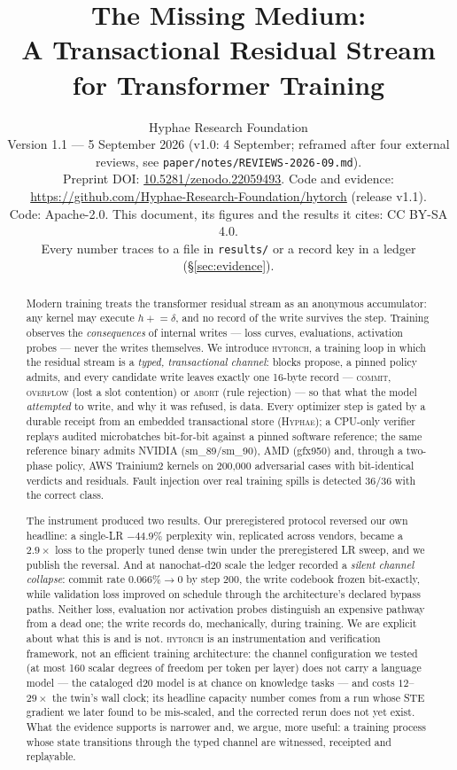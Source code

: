 \documentclass[10pt,twocolumn]{article}
\title{\textbf{The Missing Medium:\\ A Transactional Residual Stream for Transformer Training}}
\author{
  Hyphae Research Foundation\\[2pt]
  \small Version 1.1 --- 5 September 2026 (v1.0: 4 September; reframed after four external reviews, see \texttt{paper/notes/REVIEWS-2026-09.md}).\\
  \small Preprint DOI: \href{https://doi.org/10.5281/zenodo.22059493}{10.5281/zenodo.22059493}. Code and evidence: \url{https://github.com/Hyphae-Research-Foundation/hytorch} (release v1.1).\\
  \small Code: Apache-2.0. This document, its figures and the results it cites: CC BY-SA 4.0.\\
  \small Every number traces to a file in \texttt{results/} or a record key in a \hyphae{} ledger (\S\ref{sec:evidence}).
}
\date{}
\newcommand{\sys}{\textsc{hytorch}}
\newcommand{\hyphae}{\textsc{Hyphae}}
\begin{document}
\maketitle

\begin{abstract}
Modern training treats the transformer residual stream as an anonymous
accumulator: any kernel may execute $h \mathrel{+}= \delta$, and no record of
the write survives the step. Training observes the \emph{consequences} of
internal writes --- loss curves, evaluations, activation probes --- never the
writes themselves. We introduce \sys{}, a training loop in which the residual
stream is a \emph{typed, transactional channel}: blocks propose, a pinned
policy admits, and every candidate write leaves exactly one 16-byte record
--- \textsc{commit}, \textsc{overflow} (lost a slot contention) or
\textsc{abort} (rule rejection) --- so that what the model \emph{attempted}
to write, and why it was refused, is data. Every optimizer step is gated by a
durable receipt from an embedded transactional store (\hyphae{}); a CPU-only
verifier replays audited microbatches bit-for-bit against a pinned software
reference; the same reference binary admits NVIDIA (sm\_89/sm\_90), AMD
(gfx950) and, through a two-phase policy, AWS Trainium2 kernels on 200{,}000
adversarial cases with bit-identical verdicts and residuals. Fault injection
over real training spills is detected 36/36 with the correct class.

The instrument produced two results. Our preregistered protocol reversed our
own headline: a single-LR $-44.9\%$ perplexity win, replicated across
vendors, became a $2.9\times$ loss to the properly tuned dense twin under the
preregistered LR sweep, and we publish the reversal. And at nanochat-d20 scale
the ledger recorded a \emph{silent channel collapse}: commit rate
$0.066\%\!\to\!0$ by step 200, the write codebook frozen bit-exactly, while
validation loss improved on schedule through the architecture's declared
bypass paths. Neither loss, evaluation nor activation probes distinguish an
expensive pathway from a dead one; the write records do, mechanically, during
training. We are explicit about what this is and is not. \sys{} is an
instrumentation and verification framework, not an efficient training
architecture: the channel configuration we tested (at most 160 scalar degrees
of freedom per token per layer) does not carry a language model --- the
cataloged d20 model is at chance on knowledge tasks --- and costs
$12$--$29\times$ the twin's wall clock; its headline capacity number comes
from a run whose STE gradient we later found to be mis-scaled, and the
corrected rerun does not yet exist. What the evidence supports is narrower and,
we argue, more useful: a training process whose state transitions through the
typed channel are witnessed, receipted and replayable.
\end{abstract}
\end{document}
